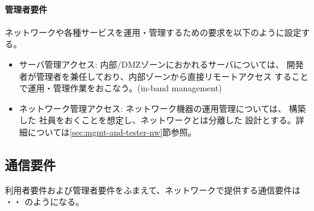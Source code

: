     \paragraph{管理者要件}
ネットワークや各種サービスを運用・管理するための要求を以下のように設定する。
\begin{itemize}
 \item サーバ管理アクセス: 内部/DMZゾーンにおかれるサーバについては、\yo
       開発者が管理者を兼任しており、内部ゾーンから直接リモートアクセス
       することで運用・管理作業をおこなう。(in-band management)
 \item ネットワーク管理アクセス: ネットワーク機器の運用管理については、
       構築した \tj 社員をおくことを想定し、\yo ネットワークとは分離した
       設計とする。詳細については\ref{sec:mgmt-and-tester-nw}節参照。
\end{itemize}

  \subsection{通信要件}

利用者要件および管理者要件をふまえて、ネットワークで提供する通信要件は
・・
 のようになる。

